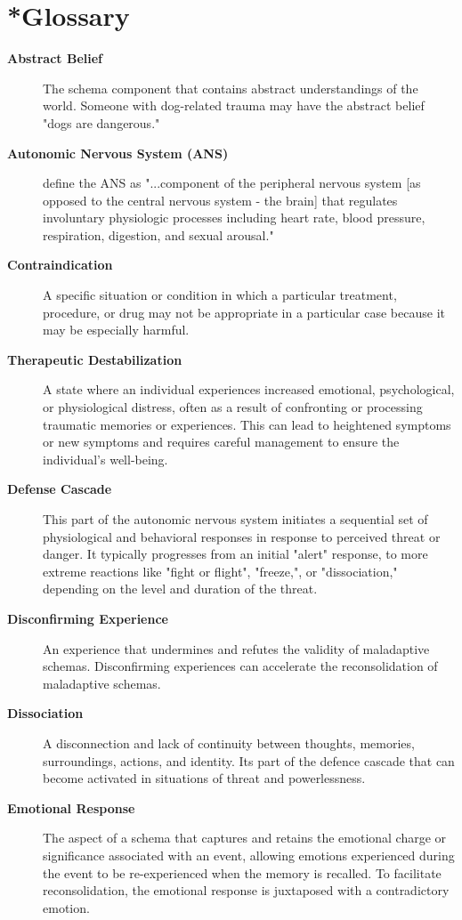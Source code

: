 \documentclass[12pt,letterpaper]{book}
\begin{document}
\section{*Glossary}
\label{sec:glossary}
\begin{description}
    \item[\textbf{Abstract Belief}] The schema component that contains abstract understandings of the world. Someone with dog-related trauma may have the abstract belief "dogs are dangerous."
    \item[\textbf{Autonomic Nervous System (ANS)}] \textcite{waxenbaum2019ANS} define the ANS as "...component of the peripheral nervous system [as opposed to the central nervous system - the brain] that regulates involuntary physiologic processes including heart rate, blood pressure, respiration, digestion, and sexual arousal."
    \item[\textbf{Contraindication}] A specific situation or condition in which a particular treatment, procedure, or drug may not be appropriate in a particular case because it may be especially harmful.
    \item[\textbf{Therapeutic Destabilization}] A state where an individual experiences increased emotional, psychological, or physiological distress, often as a result of confronting or processing traumatic memories or experiences. This can lead to heightened symptoms or new symptoms and requires careful management to ensure the individual's well-being.
    \item[\textbf{Defense Cascade}] This part of the autonomic nervous system initiates a sequential set of physiological and behavioral responses in response to perceived threat or danger. It typically progresses from an initial "alert" response, to more extreme reactions like "fight or flight", "freeze,", or "dissociation," depending on the level and duration of the threat.
    \item[\textbf{Disconfirming Experience}] An experience that undermines and refutes the validity of maladaptive schemas. Disconfirming experiences can accelerate the reconsolidation of maladaptive schemas.
    \item[\textbf{Dissociation}] A disconnection and lack of continuity between thoughts, memories, surroundings, actions, and identity. Its part of the defence cascade that can become activated in situations of threat and powerlessness.
    \item[\textbf{Emotional Response}] The aspect of a schema that captures and retains the emotional charge or significance associated with an event, allowing emotions experienced during the event to be re-experienced when the memory is recalled. To facilitate reconsolidation, the emotional response is juxtaposed with a contradictory emotion.

\end{description}
\end{document}

